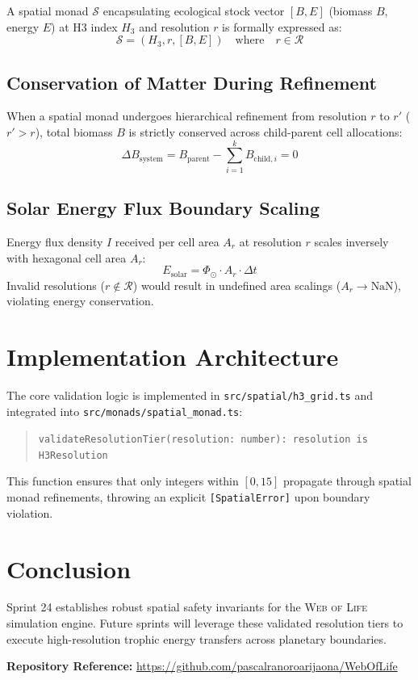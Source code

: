 \documentclass[11pt, a4paper]{article}
\begin{document}
A spatial monad $\mathcal{S}$ encapsulating ecological stock vector $[B, E]$ (biomass $B$, energy $E$) at H3 index $H_3$ and resolution $r$ is formally expressed as:
$$\mathcal{S} = (H_3, r, [B, E]) \quad \text{where} \quad r \in \mathcal{R}$$

\subsection{Conservation of Matter During Refinement}
When a spatial monad undergoes hierarchical refinement from resolution $r$ to $r'$ ($r' > r$), total biomass $B$ is strictly conserved across child-parent cell allocations:
$$\Delta B_{\text{system}} = B_{\text{parent}} - \sum_{i=1}^{k} B_{\text{child}, i} = 0$$

\subsection{Solar Energy Flux Boundary Scaling}
Energy flux density $I$ received per cell area $A_r$ at resolution $r$ scales inversely with hexagonal cell area $A_r$:
$$E_{\text{solar}} = \Phi_{\odot} \cdot A_r \cdot \Delta t$$
Invalid resolutions ($r \notin \mathcal{R}$) would result in undefined area scalings ($A_r \to \text{NaN}$), violating energy conservation.

\section{Implementation Architecture}
The core validation logic is implemented in \texttt{src/spatial/h3\_grid.ts} and integrated into \texttt{src/monads/spatial\_monad.ts}:

\begin{quote}
\texttt{validateResolutionTier(resolution: number): resolution is H3Resolution}
\end{quote}

This function ensures that only integers within $[0, 15]$ propagate through spatial monad refinements, throwing an explicit \texttt{[SpatialError]} upon boundary violation.

\section{Conclusion}
Sprint 24 establishes robust spatial safety invariants for the \textsc{Web of Life} simulation engine. Future sprints will leverage these validated resolution tiers to execute high-resolution trophic energy transfers across planetary boundaries.

\vspace{1em}
\noindent\textbf{Repository Reference:} \url{https://github.com/pascalranoroarijaona/WebOfLife}
\end{document}
